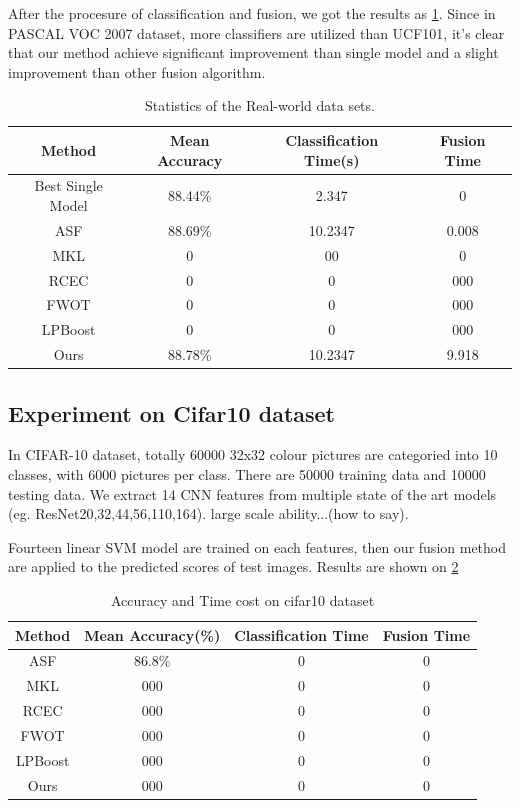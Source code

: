 \documentclass[letterpaper]{article}
\begin{document}
After the procesure of classification and fusion, we got the results as \ref{table:voc}. Since in PASCAL VOC 2007 dataset, more classifiers are utilized than UCF101, it's clear that our method achieve significant improvement than single model and a slight improvement than other fusion algorithm.

\begin{table}[h]\scriptsize
\centering
\label{table:voc}
\begin{tabular}{c|c|c|c}
\hline
Method            & Mean Accuracy & Classification Time(s)& Fusion Time \\\hline
Best Single Model & 88.44\%       &  2.347                &      0    \\\hline
ASF               & 88.69\%       &  10.2347              &    0.008   \\ %
MKL               &     0 & 00 & 0 \\
RCEC              &     0 & 0 & 000 \\
FWOT              &     0 & 0 & 000 \\
LPBoost           &     0 & 0 & 000 \\\hline
Ours              & 88.78\%       & 10.2347               & 9.918 \\
\hline
\end{tabular}
\caption{Statistics of the Real-world data sets.}
\end{table}


\subsection{Experiment on Cifar10 dataset}
In CIFAR-10 dataset, totally 60000 32x32 colour pictures are categoried into 10 classes, with 6000 pictures per class. There are 50000 training data and 10000 testing data. We extract 14 CNN features from multiple state of the art models (eg. ResNet20,32,44,56,110,164). large scale ability...(how to say).

Fourteen linear SVM model are trained on each features, then our fusion method are applied to the predicted scores of test images. Results are shown on \ref{table:cifar10}


\begin{table}[h]\scriptsize
\centering
\label{table:cifar10}
\begin{tabular}{c|c|c|c}
\hline
Method & Mean Accuracy(\%) & Classification Time & Fusion Time\\\hline
ASF &  86.8\% & 0 & 0 \\
MKL &  000 & 0 & 0 \\
RCEC &  000 & 0 & 0 \\
FWOT &  000 & 0 & 0 \\
LPBoost & 000 & 0 & 0 \\\hline
Ours &  000 & 0 & 0 \\
\hline
\end{tabular}
\caption{Accuracy and Time cost on cifar10 dataset}
\end{table}
\end{document}
